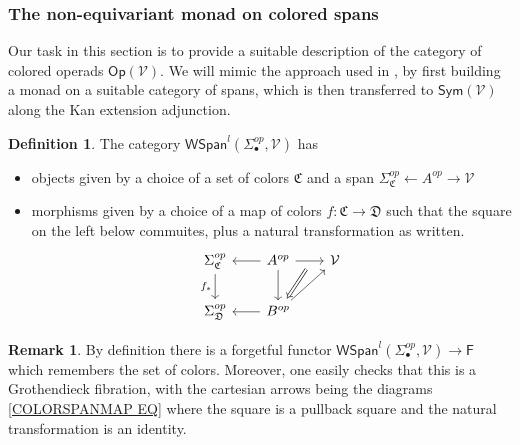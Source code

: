 \documentclass[a4paper,10pt
,draft
]{article}%
\numberwithin{equation}{section}
\numberwithin{figure}{section}
\theoremstyle{definition} %
\newtheorem{definition}[equation]{Definition}%
\newtheorem{remark}[equation]{Remark}%
\newcommand{\1}{\ensuremath{\mathbbm 1}}%
\begin{document}
\subsubsection{The non-equivariant monad on colored spans}

Our task in this section is to provide a suitable description of
the category of colored operads $\mathsf{Op}(\mathcal{V})$.
We will mimic the approach used in \cite{BP_geo},
by first building a monad on a suitable category of spans, which is then transferred to $\mathsf{Sym}(\mathcal{V})$ along the Kan extension adjunction.



\begin{definition}
The category $\mathsf{WSpan}^l(\Sigma_{\bullet}^{op},\mathcal{V})$ has
\begin{itemize}
\item objects given by a choice of a set of colors $\mathfrak{C}$
and a span $\Sigma^{op}_{\mathfrak{C}} \leftarrow A^{op} \rightarrow \mathcal{V}$
\item morphisms given by a choice of a map of colors
$f \colon \mathfrak{C} \to \mathfrak{D}$
such that the square on the left below commuites, plus a natural transformation as written.
\begin{equation}\label{COLORSPANMAP EQ}
\begin{tikzcd}[column sep = 20pt]
	\Sigma_{\mathfrak{C}}^{op}
		\ar{d}[swap]{f_{\**}} &
	A^{op}
		\ar{r}[name=U,swap]{} \ar{d} \ar{l} &
	\mathcal{V}	
\\
	\Sigma_{\mathfrak{D}}^{op}
		&
	|[alias=V]|
	B^{op} \ar{l}
		\ar{ru}
\arrow[Leftarrow, from=V, to=U,shorten >=0.05cm,shorten <=0.05cm]
\end{tikzcd}
\end{equation}
\end{itemize}
\end{definition}



\begin{remark}
By definition there is a forgetful functor
$\mathsf{WSpan}^l(\Sigma_{\bullet}^{op},\mathcal{V}) \to \mathsf{F}$
which remembers the set of colors.
Moreover, one easily checks that this is a Grothendieck fibration, with the cartesian arrows being the diagrams \eqref{COLORSPANMAP EQ} where the square is a pullback square and the natural transformation is an identity.
\end{remark}
\end{document}
